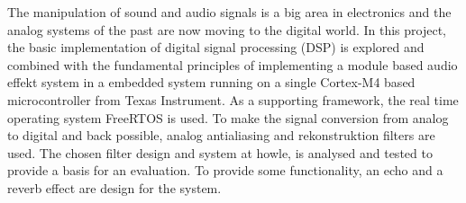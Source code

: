 The manipulation of sound and audio signals is a big area in electronics and the analog systems of the past are now moving to the digital world. In this project, the basic implementation of digital signal processing (DSP) is explored and combined with the fundamental principles of implementing a module based audio effekt system in a embedded system running on a single Cortex-M4 based microcontroller from Texas Instrument. As a supporting framework, the real time operating system FreeRTOS is used. To make the signal conversion from analog to digital and back possible, analog antialiasing and rekonstruktion filters are used. The chosen filter design and system at howle, is analysed and tested to provide a basis for an evaluation. To provide some functionality, an echo and a reverb effect are design for the system.      